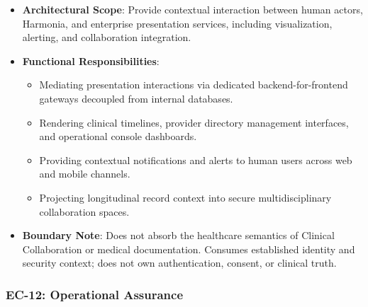 \begin{itemize}

\item
\textbf{Architectural Scope}: Provide contextual interaction between human actors, Harmonia, and enterprise presentation services, including visualization, alerting, and collaboration integration.



\item
\textbf{Functional Responsibilities}:


\begin{itemize}

\item
Mediating presentation interactions via dedicated backend-for-frontend gateways decoupled from internal databases.



\item
Rendering clinical timelines, provider directory management interfaces, and operational console dashboards.



\item
Providing contextual notifications and alerts to human users across web and mobile channels.



\item
Projecting longitudinal record context into secure multidisciplinary collaboration spaces.



\end{itemize}


\item
\textbf{Boundary Note}: Does not absorb the healthcare semantics of Clinical Collaboration or medical documentation. Consumes established identity and security context; does not own authentication, consent, or clinical truth.



\end{itemize}
\label{rad:enterprise:202}
\subsubsection*{EC-12: Operational Assurance}
\label{rad:enterprise:203}

